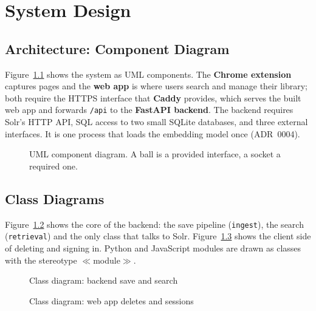 
\chapter{System Design}
\label{ch:design}

\section{Architecture: Component Diagram}

Figure~\ref{fig:components} shows the system as UML components. The
\textbf{Chrome extension} captures pages and the \textbf{web app} is where
users search and manage their library; both require the HTTPS interface that
\textbf{Caddy} provides, which serves the built web app and forwards
\texttt{/api} to the \textbf{FastAPI backend}. The backend requires Solr's
HTTP API, SQL access to two small SQLite databases, and three external
interfaces. It is one process that loads the embedding model once (ADR~0004).

\begin{figure}[H]
\centering

\caption{UML component diagram. A ball is a provided interface, a socket a required one.}
\label{fig:components}
\end{figure}

\section{Class Diagrams}

Figure~\ref{fig:class-backend} shows the core of the backend: the save
pipeline (\texttt{ingest}), the search (\texttt{retrieval}) and the only class
that talks to Solr. Figure~\ref{fig:class-client} shows the client side of
deleting and signing in. Python and JavaScript modules are drawn as classes
with the stereotype $\ll$module$\gg$.

\begin{figure}[H]
\centering

\caption{Class diagram: backend save and search}
\label{fig:class-backend}
\end{figure}

\begin{figure}[H]
\centering

\caption{Class diagram: web app deletes and sessions}
\label{fig:class-client}
\end{figure}

